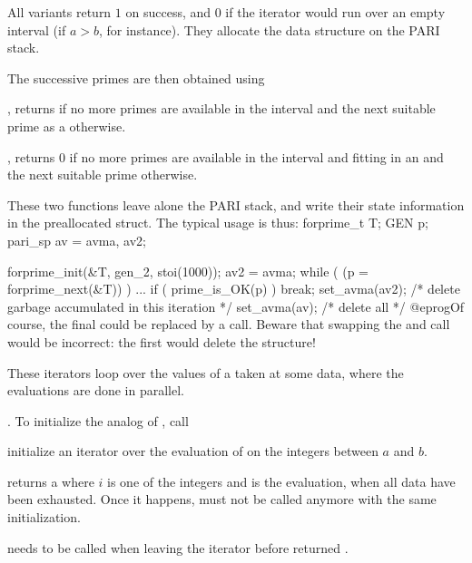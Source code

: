 All variants return $1$ on success, and $0$ if the iterator would run over an
empty interval (if $a > b$, for instance). They allocate the 
data structure on the PARI stack.

\noindent The successive primes are then obtained using

, returns  if no more primes
are available in the interval and the next suitable prime as a 
otherwise.

, returns $0$ if no more primes
are available in the interval and fitting in an  and the next
suitable prime otherwise.

These two functions leave alone the PARI stack, and write their state
information in the preallocated  struct. The typical usage is
thus:
\bprog
  forprime_t T;
  GEN p;
  pari_sp av = avma, av2;

  forprime_init(&T, gen_2, stoi(1000));
  av2 = avma;
  while ( (p = forprime_next(&T)) )
  {
    ...
    if ( prime_is_OK(p) ) break;
    set_avma(av2); /* delete garbage accumulated in this iteration */
  }
  set_avma(av); /* delete all */
@eprog\noindent Of course, the final  could be replaced
by a  call. Beware that swapping the  and
 call would be incorrect: the first 
would delete the  structure!


These iterators loop over the values of a  taken at some data,
where the evaluations are done in parallel.

\item {}. To initialize the analog of
, call

initialize an iterator over the evaluation of  on the integers
between $a$ and $b$.

 returns a  \kbd{[i,code(i)]} where
$i$ is one of the integers and  is the evaluation,  when
all data have been exhausted. Once it happens,  must not be
called anymore with the same initialization.

 needs to be called when leaving the
iterator before  returned .

